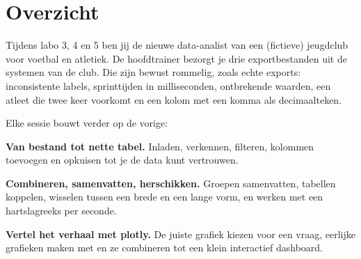 \section{Overzicht}

Tijdens labo 3, 4 en 5 ben jij de nieuwe data-analist van een
(fictieve) jeugdclub voor voetbal en atletiek. De hoofdtrainer bezorgt je
drie exportbestanden uit de systemen van de club. Die zijn bewust
rommelig, zoals echte exports: inconsistente labels, sprinttijden in
milliseconden, ontbrekende waarden, een atleet die twee keer voorkomt en
een kolom met een komma als decimaalteken.

Elke sessie bouwt verder op de vorige:

\begin{description}[leftmargin=1.6cm, style=nextline]
  \item[Labo 3] \textbf{Van bestand tot nette tabel.} Inladen, verkennen,
    filteren, kolommen toevoegen en opkuisen tot je de data kunt
    vertrouwen.
  \item[Labo 4] \textbf{Combineren, samenvatten, herschikken.} Groepen
    samenvatten, tabellen koppelen, wisselen tussen een brede en een lange
    vorm, en werken met een hartslagreeks per seconde.
  \item[Labo 5] \textbf{Vertel het verhaal met plotly.} De juiste grafiek
    kiezen voor een vraag, eerlijke grafieken maken met
     en ze combineren tot een klein interactief
    dashboard.
\end{description}
